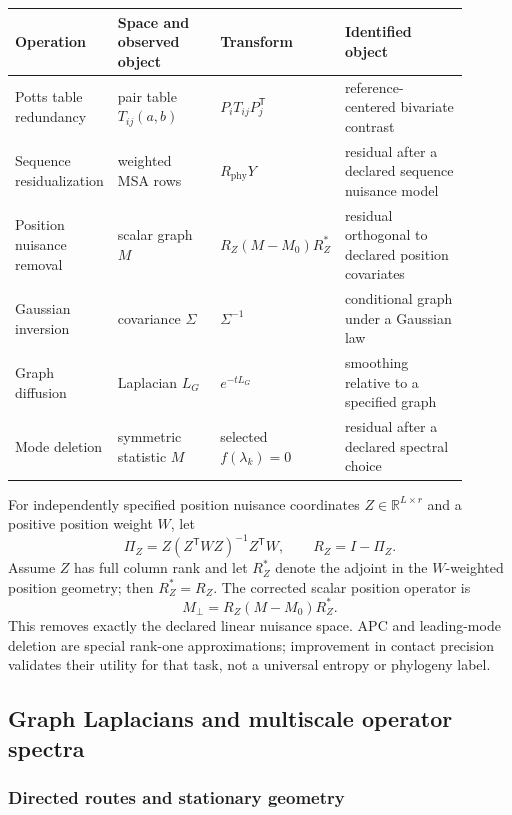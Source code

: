 \documentclass[10pt]{article}
\newcommand{\R}{\mathbb R}
\theoremstyle{definition}
\theoremstyle{remark}
\newcommand{\BookSpectralSection}[1]{\subsection{#1}}
\newcommand{\BookSubsection}[1]{\subsubsection{#1}}
\begin{document}
\begin{center}
\small
\begin{tabular}{@{}>{\raggedright\arraybackslash}p{0.18\linewidth}
                >{\raggedright\arraybackslash}p{0.23\linewidth}
                >{\raggedright\arraybackslash}p{0.21\linewidth}
                >{\raggedright\arraybackslash}p{0.28\linewidth}@{}}
\toprule
Operation & Space and observed object & Transform & Identified object \\
\midrule
Potts table redundancy & pair table $T_{ij}(a,b)$ & $P_iT_{ij}P_j^{\mathsf T}$ & reference-centered bivariate contrast \\
Sequence residualization & weighted MSA rows & $R_{\mathrm{phy}}Y$ & residual after a declared sequence nuisance model \\
Position nuisance removal & scalar graph $M$ & $R_Z(M-M_0)R_Z^*$ & residual orthogonal to declared position covariates \\
Gaussian inversion & covariance $\Sigma$ & $\Sigma^{-1}$ & conditional graph under a Gaussian law \\
Graph diffusion & Laplacian $L_G$ & $e^{-tL_G}$ & smoothing relative to a specified graph \\
Mode deletion & symmetric statistic $M$ & selected $f(\lambda_k)=0$ & residual after a declared spectral choice \\
\bottomrule
\end{tabular}
\end{center}

For independently specified position nuisance coordinates $Z\in\R^{L\times r}$ and a positive
position weight $W$, let
\begin{equation}
\Pi_Z=Z(Z^{\mathsf T}WZ)^{-1}Z^{\mathsf T}W,
\qquad R_Z=I-\Pi_Z.
\end{equation}
Assume $Z$ has full column rank and let $R_Z^*$ denote the adjoint in the $W$-weighted position
geometry; then $R_Z^*=R_Z$.
The corrected scalar position operator is
\begin{equation}
M_\perp=R_Z(M-M_0)R_Z^*.
\label{eq:position-nuisance}
\end{equation}
This removes exactly the declared linear nuisance space.  APC and leading-mode deletion are
special rank-one approximations; improvement in contact precision validates their utility for that
task, not a universal entropy or phylogeny label.

\BookSpectralSection{Graph Laplacians and multiscale operator spectra}

\BookSubsection{Directed routes and stationary geometry}
\end{document}
